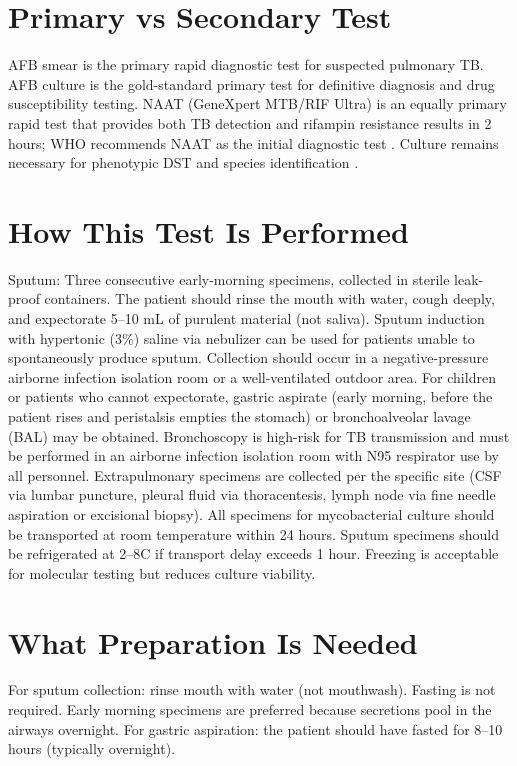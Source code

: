 \section*{Primary vs Secondary Test}
AFB smear is the primary rapid diagnostic test for suspected pulmonary TB. AFB culture is the gold-standard primary test for definitive diagnosis and drug susceptibility testing. NAAT (GeneXpert MTB/RIF Ultra) is an equally primary rapid test that provides both TB detection and rifampin resistance results in 2 hours; WHO recommends NAAT as the initial diagnostic test \cite{who2021who}. Culture remains necessary for phenotypic DST and species identification \cite{lewinsohn2017official}.

\section*{How This Test Is Performed}
Sputum: Three consecutive early-morning specimens, collected in sterile leak-proof containers. The patient should rinse the mouth with water, cough deeply, and expectorate 5--10 mL of purulent material (not saliva). Sputum induction with hypertonic (3\%) saline via nebulizer can be used for patients unable to spontaneously produce sputum. Collection should occur in a negative-pressure airborne infection isolation room or a well-ventilated outdoor area. For children or patients who cannot expectorate, gastric aspirate (early morning, before the patient rises and peristalsis empties the stomach) or bronchoalveolar lavage (BAL) may be obtained. Bronchoscopy is high-risk for TB transmission and must be performed in an airborne infection isolation room with N95 respirator use by all personnel. Extrapulmonary specimens are collected per the specific site (CSF via lumbar puncture, pleural fluid via thoracentesis, lymph node via fine needle aspiration or excisional biopsy). All specimens for mycobacterial culture should be transported at room temperature within 24 hours. Sputum specimens should be refrigerated at 2--8\textdegree{}C if transport delay exceeds 1 hour. Freezing is acceptable for molecular testing but reduces culture viability.

\section*{What Preparation Is Needed}
For sputum collection: rinse mouth with water (not mouthwash). Fasting is not required. Early morning specimens are preferred because secretions pool in the airways overnight. For gastric aspiration: the patient should have fasted for 8--10 hours (typically overnight).

